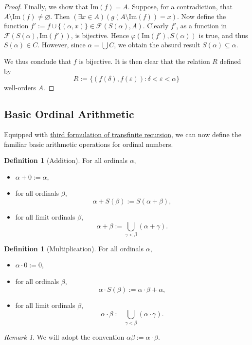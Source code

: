 \documentclass[a4paper,11pt]{article}
\theoremstyle{plain}
\theoremstyle{definition}
\newtheorem{defn}[thm]{Definition}
\theoremstyle{remark}
\newtheorem*{rem}{Remark}
\begin{document}
\begin{proof}
Finally, we show that $\mathrm{Im}(f) = A$. Suppose, for a contradiction, that $A\setminus\mathrm{Im}(f) \neq \varnothing$. Then $(\exists x \in A)(g(A\setminus\mathrm{Im}(f)) = x)$. Now define the function $f' :=  f \cup \{(\alpha, x)\} \in \mathscr F(S(\alpha),A)$. Clearly $f'$, as a function in $\mathscr F(S(\alpha),\mathrm{Im}(f'))$, is bijective. Hence $\varphi(\mathrm{Im}(f'), S(\alpha))$ is true, and thus $S(\alpha) \in C$. However, since $\alpha = \bigcup C$, we obtain the absurd result $S(\alpha) \subseteq \alpha$.

We thus conclude that $f$ is bijective. It is then clear that the relation $R$ defined by 
\[R := \{(f(\delta), f(\varepsilon)) : \delta < \varepsilon < \alpha\}\]
well-orders $A$.
\end{proof}

\subsection{Basic Ordinal Arithmetic}
Equipped with \hyperref[thm:Trecursion3]{third formulation of transfinite recursion}, we can now define the familiar basic arithmetic operations for ordinal numbers.

\begin{defn}[Addition]
\label{defn:addition}
For all ordinals $\alpha$,
\begin{itemize}
\item $\alpha + 0 := \alpha$,
\item for all ordinals $\beta$, 
\[\alpha + S(\beta) := S(\alpha + \beta),\]
\item for all limit ordinals $\beta$, 
\[\alpha + \beta := \bigcup_{\gamma<\beta}(\alpha + \gamma).\]
\end{itemize}
\end{defn}

\begin{defn}[Multiplication]
\label{defn:multiplication}
For all ordinals $\alpha$,
\begin{itemize}
\item $\alpha \cdot 0 := 0$,
\item for all ordinals $\beta$,
\[\alpha \cdot S(\beta) := \alpha \cdot \beta + \alpha,\]
\item for all limit ordinals $\beta$, 
\[\alpha \cdot \beta := \bigcup_{\gamma<\beta} (\alpha \cdot \gamma).\]
\end{itemize}
\end{defn}
\begin{rem}
We will adopt the convention $\alpha\beta := \alpha \cdot \beta$.
\end{rem}
\end{document}
